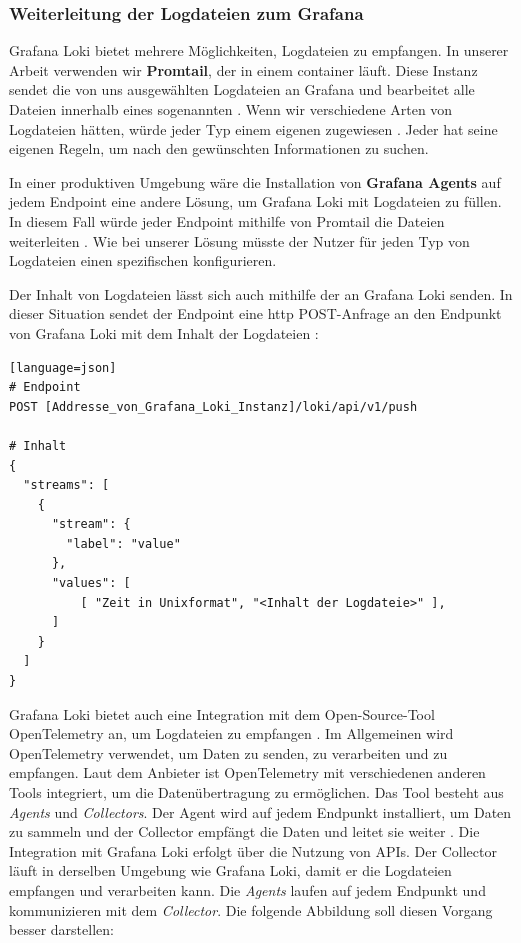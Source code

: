 \subsubsection{Weiterleitung der Logdateien zum Grafana}
Grafana Loki bietet mehrere Möglichkeiten, Logdateien zu empfangen. In unserer Arbeit verwenden wir \textbf{Promtail}, der in einem \gls{container} läuft. Diese Instanz sendet die von uns ausgewählten Logdateien an Grafana und bearbeitet alle Dateien innerhalb eines sogenannten . Wenn wir verschiedene Arten von Logdateien hätten, würde jeder Typ einem eigenen  zugewiesen \citep{Grafana_CollectLogs}. Jeder  hat seine eigenen Regeln, um nach den gewünschten Informationen zu suchen.

In einer produktiven Umgebung wäre die Installation von \textbf{Grafana Agents} auf jedem \gls{Endpoint} eine andere Lösung, um Grafana Loki mit Logdateien zu füllen. In diesem Fall würde jeder \gls{Endpoint} mithilfe von Promtail die Dateien weiterleiten \citep{Grafana_Agents}. Wie bei unserer Lösung müsste der Nutzer für jeden Typ von Logdateien einen spezifischen  konfigurieren.

Der Inhalt von Logdateien lässt sich auch mithilfe der \textbf{} an Grafana Loki senden. In dieser Situation sendet der \gls{Endpoint} eine \gls{http} POST-Anfrage an den Endpunkt von Grafana Loki mit dem Inhalt der Logdateien \citep{Grafana_api}:

{
\begin{lstlisting}[frame=single][language=json]
# Endpoint 
POST [Addresse_von_Grafana_Loki_Instanz]/loki/api/v1/push

# Inhalt
{
  "streams": [
    {
      "stream": {
        "label": "value"
      },
      "values": [
          [ "Zeit in Unixformat", "<Inhalt der Logdateie>" ],
      ]
    }
  ]
}
\end{lstlisting}
}

Grafana Loki bietet auch eine Integration mit dem Open-Source-Tool OpenTelemetry an, um Logdateien zu empfangen \citep{Grafana_opentelemetry}. Im Allgemeinen wird OpenTelemetry verwendet, um Daten zu senden, zu verarbeiten und zu empfangen. Laut dem Anbieter ist OpenTelemetry mit verschiedenen anderen Tools integriert, um die Datenübertragung zu ermöglichen. Das Tool besteht aus \textit{Agents} und \textit{Collectors}. Der Agent wird auf jedem Endpunkt installiert, um Daten zu sammeln und der Collector empfängt die Daten und leitet sie weiter \citep{Grafana_opentelemetry}. Die Integration mit Grafana Loki erfolgt über die Nutzung von APIs. Der Collector läuft in derselben Umgebung wie Grafana Loki, damit er die Logdateien empfangen und verarbeiten kann. Die \textit{Agents} laufen auf jedem Endpunkt und kommunizieren mit dem \textit{Collector}. Die folgende Abbildung soll diesen Vorgang besser darstellen:

